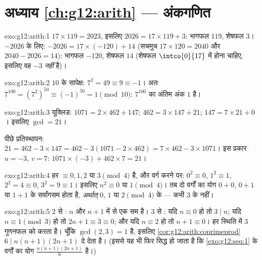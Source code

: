 \section*{अध्याय \ref{ch:g12:arith} --- अंकगणित}

\begin{solution}{exo:g12:arith:1}
$17 \times 119 = 2023$, इसलिए $2026 = 17 \times 119 + 3$: भागफल $119$, शेषफल $3$। $-2026$ के लिए: $-2026 = 17\times(-120) + 14$ (सचमुच $17 \times 120 = 2040$ और $2040 - 2026 = 14$):
भागफल $-120$, शेषफल $14$ (शेषफल $\intco{0}{17}$ में होना चाहिए, इसलिए वह $-3$
\emph{नहीं} है)।
\end{solution}

\begin{solution}{exo:g12:arith:2}
$10$ के सापेक्ष: $7^2 = 49 \equiv 9 \equiv -1$। अतः $7^{100} = \left(7^2\right)^{50} \equiv (-1)^{50} = 1 \pmod{10}$: $7^{100}$ का अंतिम अंक $1$ है।
\end{solution}

\begin{solution}{exo:g12:arith:3}
यूक्लिड: $1071 = 2\times462 + 147$; $462 = 3\times147 + 21$; $147 = 7\times21 + 0$। इसलिए $\gcd = 21$।

पीछे प्रतिस्थापन: $21 = 462 - 3\times147 = 462 - 3(1071 - 2\times462)
= 7\times462 - 3\times1071$। इस प्रकार $u = -3$, $v = 7$: $1071\times(-3) + 462\times7 = 21$।
\end{solution}

\begin{solution}{exo:g12:arith:4}
हर  $\equiv 0, 1, 2$ या $3 \pmod 4$ है, और वर्ग करने पर: $0^2 \equiv 0$, $1^2 \equiv 1$, $2^2 = 4 \equiv 0$, $3^2 = 9 \equiv 1$। इसलिए
$n^2 \equiv 0$ या $1 \pmod 4$। तब दो वर्गों का योग $0 + 0$, $0 + 1$ या $1 + 1$ के सर्वांगसम होता है,
\emph{अर्थात्} $0$, $1$ या $2 \pmod 4$ के --- कभी $3$ के नहीं।
\end{solution}

\begin{solution}{exo:g12:arith:5}
$2$ से : $n$ और $n + 1$ में से एक सम है। $3$ से : यदि $n \equiv 0$
हो तो $3 \mid n$; यदि $n \equiv 1 \pmod 3$ हो तो $2n + 1 \equiv 3 \equiv 0$; और यदि $n \equiv 2$ हो तो $n + 1 \equiv 0$। हर स्थिति में $3$
गुणनफल को  करता है। चूँकि $\gcd(2,3) = 1$ है, इसलिए \cref{cor:g12:arith:coprimeprod} $6 \mid n(n+1)(2n+1)$ दे देता है। (इससे
यह भी फिर सिद्ध हो जाता है कि \cref{exo:g12:seq:1} के वर्गों का योग $\frac{n(n+1)(2n+1)}{6}$  है।)
\end{solution}

